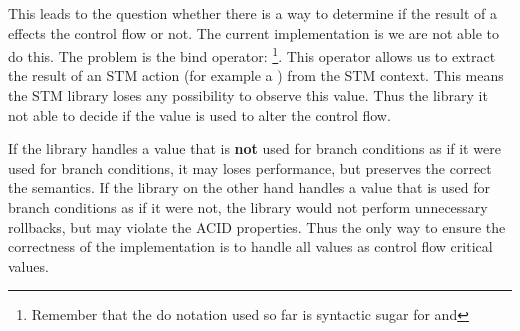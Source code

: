 This leads to the question whether there is a way to determine if the result of a  effects the 
control flow or not. The current implementation is we are not able to do this. The problem is the bind
operator: \footnote{Remember that the do notation used so far is 
syntactic sugar for \code{>>=} and \code{>>}}. This operator allows us to extract the result of an STM action 
(for example a ) from the STM context. This means the STM library loses any possibility to 
observe this value. Thus the library it not able to decide if the value is used to alter the control flow.

If the library handles a value that is \textbf{not} used for branch conditions as if it were used for branch conditions, 
it may loses performance, but preserves the correct the semantics. If the library on the other hand handles a value that is
used for branch conditions as if it were not, the library would not perform unnecessary rollbacks, but may violate 
the ACID properties. Thus the only way to ensure the correctness of the implementation is to handle all 
values as control flow critical values. 



% 
% 

